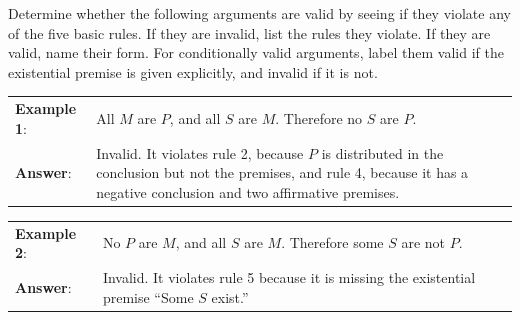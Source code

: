 
\practiceproblems
\noindent \problempart Determine whether the following arguments are valid by seeing if they violate any of the five basic rules. If they are invalid, list the rules they violate. If they are valid, name their form. For conditionally valid arguments, label them valid if the existential premise is given explicitly, and invalid if it is not. 

\begin{longtabu}{p{.15\linewidth}p{.9\linewidth}} 
\textbf{Example 1}: &All $M$ are $P$, and all $S$ are $M$. Therefore no $S$ are $P$.\\ 
\textbf{Answer}: & Invalid. It violates rule 2, because $P$ is distributed in the conclusion but not the premises, and rule 4, because it has a negative conclusion and two affirmative premises.\\ 
\end{longtabu} 

\begin{longtabu}{p{.15\linewidth}p{.9\linewidth}} 
\textbf{Example 2}: & No $P$ are $M$, and all $S$ are $M$. Therefore some $S$ are not $P$.\\ 
\textbf{Answer}: & Invalid. It violates rule 5 because it is missing the existential premise ``Some $S$ exist.''\\ 
\end{longtabu} 


